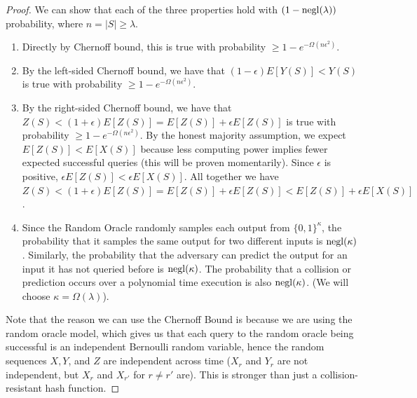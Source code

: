 \begin{proof} We can show that each of the three properties hold with $(1-\mathrm{negl}(\lambda))$ probability, where $n=|S| \geq \lambda$.

\begin{enumerate}
    \item Directly by Chernoff bound, this is true with probability $\geq 1 - e^{-\Omega(n\epsilon^2)}$.

    \item By the left-sided Chernoff bound, we have that $(1-\epsilon) E[Y(S)] < Y(S) $ is true with probability $\geq 1 - e^{-\Omega(n\epsilon^2)}$.

    \item By the right-sided Chernoff bound, we have that $ Z(S) < (1+\epsilon) E[Z(S)] = E[Z(S)] + \epsilon E[Z(S)] $ is true with probability $\geq 1 - e^{-\Omega(n\epsilon^2)}$. By the honest majority assumption, we expect $E[Z(S)] < E[X(S)]$ because less computing power implies fewer expected successful queries (this will be proven momentarily). Since $\epsilon$ is positive, $\epsilon E[Z(S)] < \epsilon E[X(S)]$. All together we have $ Z(S) < (1+\epsilon) E[Z(S)] = E[Z(S)] + \epsilon E[Z(S)] < E[Z(S)] + \epsilon E[X(S)]$.

    \item Since the Random Oracle randomly samples each output from $\{0,1\}^{\kappa}$, the probability that it samples the same output for two different inputs is $\mathrm{negl}(\kappa)$. Similarly, the probability that the adversary can predict the output for an input it has not queried before is $\mathrm{negl}(\kappa)$. The probability that a collision or prediction occurs over a polynomial time execution is also $\mathrm{negl}(\kappa)$. (We will choose $\kappa = \Omega(\lambda)$).
\end{enumerate}

Note that the reason we can use the Chernoff Bound is because we are using the random oracle model, which gives us that each query to the random oracle being successful is an independent Bernoulli random variable, hence the random sequences $X, Y$, and $Z$ are independent across time ($X_r$ and $Y_r$ are not independent, but $X_r$ and $X_{r'}$ for $r \neq r'$ are). This is stronger than just a collision-resistant hash function.

\end{proof}

